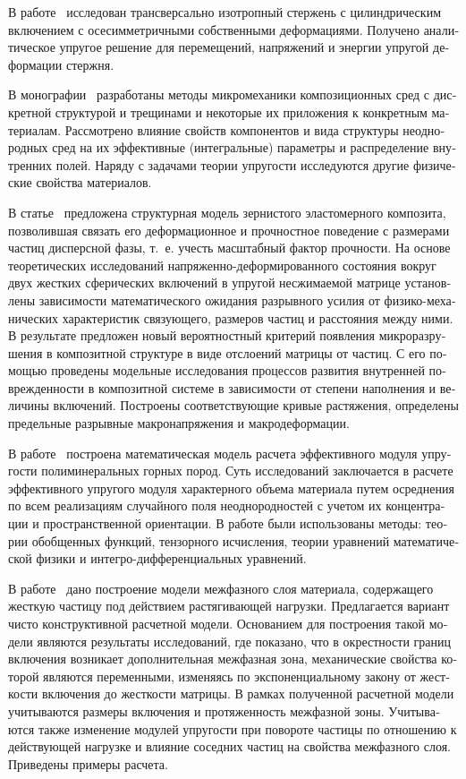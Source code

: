 \begin{russian}
В работе~\cite{Zhong} исследован трансверсально изотропный стержень с цилиндрическим включением с осесимметричными собственными деформациями. Получено аналитическое упругое решение для перемещений, напряжений и энергии упругой деформации стержня.

В монографии~\cite{Vanin1985} разработаны методы микромеханики композиционных сред с дискретной структурой и трещинами и некоторые их приложения к конкретным материалам. Рассмотрено влияние свойств компонентов и вида структуры неоднородных сред на их эффективные (интегральные) параметры и распределение внутренних полей. Наряду с задачами теории упругости исследуются другие физические свойства материалов.

В статье~\cite{Garishin} предложена структурная модель зернистого эластомерного композита, позволившая связать его деформационное и прочностное поведение с размерами частиц дисперсной фазы, т.~е. учесть масштабный фактор прочности. На основе теоретических исследований на\-пря\-жен\-но-де\-фор\-ми\-ро\-ван\-но\-го состояния вокруг двух жестких сферических включений в упругой несжимаемой матрице установлены зависимости математического ожидания разрывного усилия от физико-механических характеристик связующего, размеров частиц и расстояния между ними. В результате предложен новый вероятностный критерий появления микроразрушения в композитной структуре в виде отслоений матрицы от частиц. С его помощью проведены модельные исследования процессов развития внутренней поврежденности в композитной системе в зависимости от степени наполнения и величины включений. Построены соответствующие кривые растяжения, определены предельные разрывные макронапряжения и макродеформации.

В работе~\cite{Shailiev} построена математическая модель расчета эффективного модуля упругости полиминеральных горных пород. Суть исследований заключается в расчете эффективного упругого модуля характерного объема материала путем осреднения по всем реализациям случайного поля неоднородностей с учетом их концентрации и пространственной ориентации. В работе были использованы методы: теории обобщенных функций, тензорного исчисления, теории уравнений математической физики и ин\-тег\-ро-\-диф\-фе\-рен\-ци\-аль\-ных уравнений.

В работе~\cite{Dudchenko} дано построение модели межфазного слоя материала, содержащего жесткую частицу под действием растягивающей нагрузки. Предлагается вариант чисто конструктивной расчетной модели. Основанием для построения такой модели являются результаты исследований, где показано, что в окрестности границ включения возникает дополнительная межфазная зона, механические свойства которой являются переменными, изменяясь по экспоненциальному закону от жесткости включения до жесткости матрицы. В рамках полученной расчетной модели учитываются размеры включения и протяженность межфазной зоны. Учитываются также изменение модулей упругости при повороте частицы по отношению к действующей нагрузке и влияние соседних частиц на свойства межфазного слоя. Приведены примеры расчета.


\end{russian}
